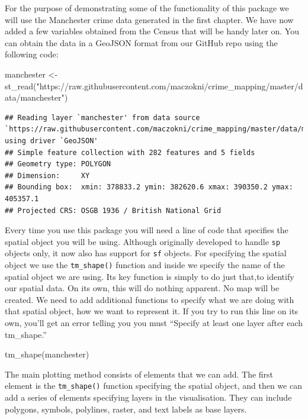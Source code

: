 \documentclass[
]{book}
\newenvironment{Shaded}{\begin{snugshade}}{\end{snugshade}}
\newcommand{\FunctionTok}[1]{\textcolor[rgb]{0.00,0.00,0.00}{#1}}
\newcommand{\NormalTok}[1]{#1}
\newcommand{\OtherTok}[1]{\textcolor[rgb]{0.56,0.35,0.01}{#1}}
\newcommand{\StringTok}[1]{\textcolor[rgb]{0.31,0.60,0.02}{#1}}
\begin{document}
For the purpose of demonstrating some of the functionality of this package we will use the Manchester crime data generated in the first chapter. We have now added a few variables obtained from the Census that will be handy later on. You can obtain the data in a GeoJSON format from our GitHub repo using the following code:

\begin{Shaded}
\begin{Highlighting}[]
\NormalTok{manchester }\OtherTok{\textless{}{-}} \FunctionTok{st\_read}\NormalTok{(}\StringTok{"https://raw.githubusercontent.com/maczokni/crime\_mapping/master/data/manchester"}\NormalTok{)}
\end{Highlighting}
\end{Shaded}

\begin{verbatim}
## Reading layer `manchester' from data source `https://raw.githubusercontent.com/maczokni/crime_mapping/master/data/manchester' using driver `GeoJSON'
## Simple feature collection with 282 features and 5 fields
## Geometry type: POLYGON
## Dimension:     XY
## Bounding box:  xmin: 378833.2 ymin: 382620.6 xmax: 390350.2 ymax: 405357.1
## Projected CRS: OSGB 1936 / British National Grid
\end{verbatim}

Every time you use this package you will need a line of code that specifies the spatial object you will be using. Although originally developed to handle \texttt{sp} objects only, it now also has support for \texttt{sf} objects. For specifying the spatial object we use the \texttt{tm\_shape()} function and inside we specify the name of the spatial object we are using. Its key function is simply to do just that,to identify our spatial data. On its own, this will do nothing apparent. No map will be created. We need to add additional functions to specify what we are doing with that spatial object, how we want to represent it. If you try to run this line on its own, you'll get an error telling you you must ``Specify at least one layer after each tm\_shape.''

\begin{Shaded}
\begin{Highlighting}[]
\FunctionTok{tm\_shape}\NormalTok{(manchester)}
\end{Highlighting}
\end{Shaded}

The main plotting method consists of elements that we can add. The first element is the \texttt{tm\_shape()} function specifying the spatial object, and then we can add a series of elements specifying layers in the visualisation. They can include polygons, symbols, polylines, raster, and text labels as base layers.
\end{document}
